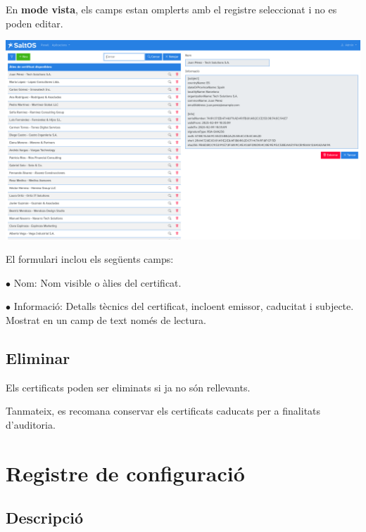 \documentclass[a4paper]{article}
\begin{document}
En \textbf{mode vista}, els camps estan omplerts amb el registre seleccionat i no es poden editar.

\begin{center}\includegraphics[width=1\textwidth]{../ujest/snaps/test-screenshots-js-screenshots-certs-certs-view-ab-877-d-2027-f-7-c-71-d-9935999-cce-1-b-802-b-ca-es-1-snap.png}\end{center}

El formulari inclou els següents camps:

\begin{compactitem}
\item[\color{myblue}$\bullet$] Nom: Nom visible o àlies del certificat.
\item[\color{myblue}$\bullet$] Informació: Detalls tècnics del certificat, incloent emissor, caducitat i subjecte. Mostrat en un camp de text només de lectura.
\end{compactitem}

\hypertarget{toc5}{}
\subsection{Eliminar}

Els certificats poden ser eliminats si ja no són rellevants.

Tanmateix, es recomana conservar els certificats caducats per a finalitats d'auditoria.


\hypertarget{toc6}{}
\section{Registre de configuració}

\hypertarget{toc7}{}
\subsection{Descripció}
\end{document}
